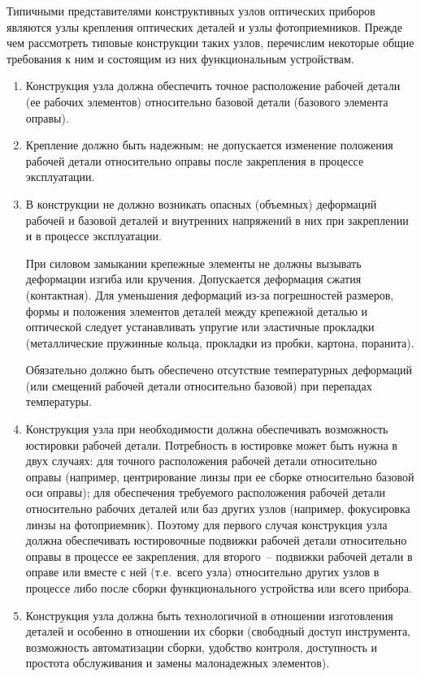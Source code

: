 Типичными представителями конструктивных узлов оптических приборов являются узлы крепления оптических деталей и узлы фотоприемников. Прежде чем рассмотреть типовые конструкции таких узлов, перечислим некоторые общие требования к ним и состоящим из них функциональным устройствам.

\begin{enumerate}
	
\item Конструкция узла должна обеспечить точное расположение рабочей детали (ее рабочих элементов) относительно базовой детали (базового элемента оправы).

\item Крепление должно быть надежным; не допускается изменение положения рабочей детали относительно оправы после закрепления в процессе эксплуатации.

\item В конструкции не должно возникать опасных (объемных) деформаций рабочей и базовой деталей и внутренних напряжений в них при закреплении и в процессе эксплуатации.

При силовом замыкании крепежные элементы не должны вызывать деформации изгиба или кручения. Допускается деформация сжатия (контактная). Для уменьшения деформаций из-за погрешностей размеров, формы и положения элементов деталей между крепежной деталью и оптической следует устанавливать упругие или эластичные прокладки (металлические пружинные кольца, прокладки из пробки, картона, поранита).

Обязательно должно быть обеспечено отсутствие температурных деформаций (или смещений рабочей детали относительно базовой) при перепадах температуры.
\item Конструкция узла при необходимости должна обеспечивать возможность юстировки рабочей детали. Потребность в юстировке может быть нужна в двух случаях: для точного расположения рабочей детали относительно оправы (например, центрирование линзы при ее сборке относительно базовой оси оправы); для обеспечения требуемого расположения рабочей детали относительно рабочих деталей или баз других узлов (например, фокусировка линзы на фотоприемник). Поэтому для первого случая конструкция узла должна обеспечивать юстировочные подвижки рабочей детали относительно оправы в процессе ее закрепления, для второго~-- подвижки рабочей детали в оправе или вместе с ней (т.е.~всего узла) относительно других узлов в процессе либо после сборки функционального устройства или всего прибора.

\item Конструкция узла должна быть технологичной в отношении изготовления деталей и особенно в отношении их сборки (свободный доступ инструмента, возможность автоматизации сборки, удобство контроля, доступность и простота обслуживания и замены малонадежных элементов).


\end{enumerate}
